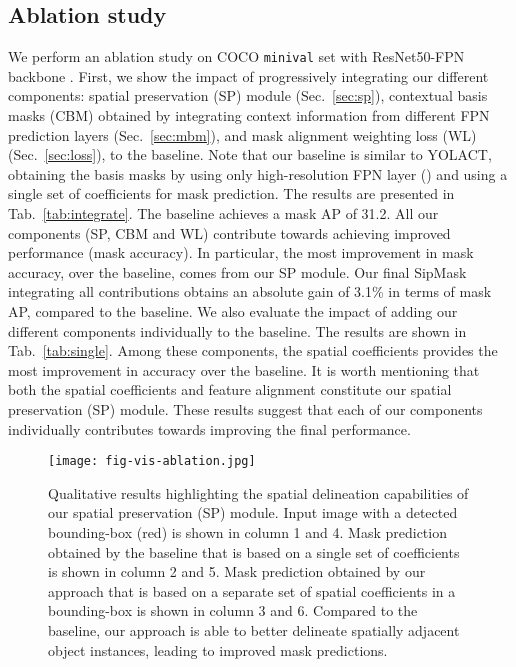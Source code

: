 \documentclass[runningheads]{llncs}
\begin{document}
\subsection{Ablation study}
We perform an ablation study on COCO \texttt{minival} set with ResNet50-FPN backbone \cite{Lin_FPN_CVPR_2017}. First, we show the impact of progressively  integrating our different components: spatial preservation (SP) module (Sec.~\ref{sec:sp}), contextual basis masks (CBM) obtained by integrating context information from different FPN prediction layers (Sec.~\ref{sec:mbm}), and mask alignment weighting loss (WL) (Sec.~\ref{sec:loss}), to the baseline. Note that our baseline is similar to YOLACT, obtaining the basis masks by using only  high-resolution FPN layer () and using a single set of coefficients for mask prediction. The results are presented in Tab.~\ref{tab:integrate}. The baseline achieves a mask AP of 31.2. All our components (SP, CBM and WL) contribute towards achieving improved performance (mask accuracy). In particular, the most improvement in mask accuracy, over the baseline, comes from our SP module. Our final SipMask integrating all contributions obtains an absolute gain of 3.1\% in terms of mask AP, compared to the baseline. 
We also evaluate the impact of adding our different components individually to the baseline. The results are shown in Tab.~\ref{tab:single}. Among these components, the spatial coefficients provides the most improvement in accuracy over the baseline. It is worth mentioning that both the spatial coefficients and feature alignment constitute our spatial preservation (SP) module. These results suggest that each of our components individually contributes towards improving the final performance. 

\begin{figure}[t!]
\centering
\texttt{[image: fig-vis-ablation.jpg]}\caption{Qualitative results highlighting the spatial delineation capabilities of our spatial preservation (SP) module. Input image with a detected bounding-box (red) is shown in column 1 and 4. Mask prediction obtained by the baseline that is based on a single set of coefficients is shown in column 2 and 5. Mask prediction obtained by our approach that is based on a separate set of spatial coefficients in a bounding-box is shown in column 3 and 6. Compared to the baseline, our approach is able to better delineate spatially adjacent object instances, leading to improved mask predictions. } \label{fig:vis_Qcompare} 
\end{figure}
\end{document}
